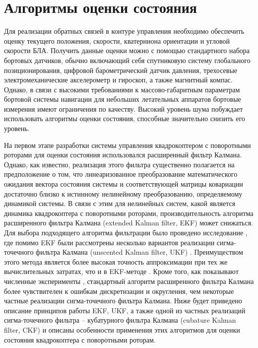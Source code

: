 
\chapter{Алгоритмы оценки состояния}
\label{chapter_estimation}

Для реализации обратных связей в контуре управления необходимо обеспечить оценку текущего положения, скорости, кватерниона ориентации и угловой скорости БЛА. Получить данные оценки можно с помощью стандартного набора бортовых датчиков, обычно включающий себя спутниковую систему глобального позиционирования, цифровой барометрический датчик давления, трехосевые электромеханические акселерометр и гироскоп, а также магнитный компас. Однако, в связи с высокими требованиями к массово-габаритным параметрам бортовой системы навигации для небольших летательных аппаратов бортовые измерения имеют ограничения по качеству. Высокий уровень шума побуждает использовать алгоритмы оценки состояния, способные значительно снизить его уровень.

На первом этапе разработки системы управления квадрокоптером с поворотными роторами для оценки состояния использовался расширенный фильтр Калмана. Однако, как известно, реализация этого фильтра существенно полагается на предположение о том, что линеаризованное преобразование математического ожидания вектора состояния системы и соответствующей матрицы ковариации достаточно близко к истинному нелинейному преобразованию, определяемому динамикой системы. В связи с этим для нелинейных систем, какой является динамика квадрокоптера с поворотными роторами, производительность алгоритма расширенного фильтра Калмана (extended Kalman filter, EKF) может снижаться.
Для выбора подходящего алгоритма фильтрации было проведено исследование \cite{Shavin02}, где помимо EKF были рассмотрены несколько вариантов реализации сигма-точечного фильтра Калмана (unscented Kalman filter, UKF) \cite{Julier01, Julier02}. Преимуществом этого метода является более высокая точность аппроксимации при тех же вычислительных затратах, что и в EKF-методе \cite{Kulikova01}. Кроме того, как показывают численные эксперименты \cite{Shavin01}, стандартный алгоритм расширенного фильтра Калмана более чувствителен к ошибкам дискретизации и округления, чем некоторые частные реализации сигма-точечного фильтра Калмана. Ниже будет приведено описание принципов работы EKF, UKF, а также одной из частных реализаций сигма-точечного фильтра -- кубатурного фильтра Калмана (cubature Kalman filter, CKF) и описаны особенности применения этих алгоритмов для оценки состояния квадрокоптера с поворотными роторам.


